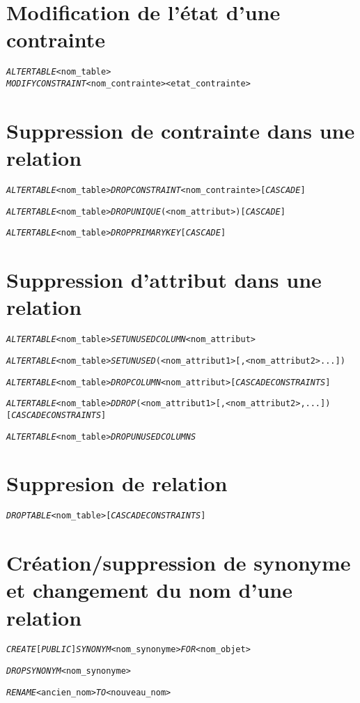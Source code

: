 \documentclass[10pt]{article}
\begin{document}
	\section{Modification de l'état d'une contrainte}
		\begin{alltt}
			\emph{ALTER TABLE} <nom_table>
			\emph{MODIFY CONSTRAINT} <nom_contrainte> <etat_contrainte>
		\end{alltt}
		
	\section{Suppression de contrainte dans une relation}
		\begin{alltt}
			\emph{ALTER TABLE} <nom_table> \emph{DROP CONSTRAINT} <nom_contrainte> [\emph{CASCADE}]
			
			\emph{ALTER TABLE} <nom_table> \emph{DROP UNIQUE}(<nom_attribut>) [\emph{CASCADE}]
			
			\emph{ALTER TABLE} <nom_table> \emph{DROP PRIMARY KEY} [\emph{CASCADE}]
		\end{alltt}
		
	\section{Suppression d'attribut dans une relation}
		\begin{alltt}
			\emph{ALTER TABLE} <nom_table> \emph{SET UNUSED COLUMN} <nom_attribut>
			
			\emph{ALTER TABLE} <nom_table> \emph{SET UNUSED}(<nom_attribut1>[, <nom_attribut2> ...])
			
			\emph{ALTER TABLE} <nom_table> \emph{DROP COLUMN} <nom_attribut> [\emph{CASCADE CONSTRAINTS}]
			
			\emph{ALTER TABLE} <nom_table> \emph{DDROP}(<nom_attribut1>[, <nom_attribut2>, ...]) [\emph{CASCADE CONSTRAINTS}]
			
			\emph{ALTER TABLE} <nom_table> \emph{DROP UNUSED COLUMNS}
		\end{alltt}
		
	\section{Suppresion de relation}
		\begin{alltt}
			\emph{DROP TABLE} <nom_table> [\emph{CASCADE CONSTRAINTS}]
		\end{alltt}
		
	\section{Création/suppression de synonyme et changement du nom d'une relation}
		\begin{alltt}
			\emph{CREATE} [\emph{PUBLIC}] \emph{SYNONYM} <nom_synonyme> \emph{FOR} <nom_objet>
			
			\emph{DROP SYNONYM} <nom_synonyme>
			
			\emph{RENAME} <ancien_nom> \emph{TO} <nouveau_nom>
		\end{alltt}
		
\end{document}
